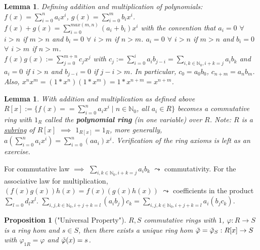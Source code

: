 \documentclass[11pt]{article}
\newtheorem{prop}[thm]{Proposition}
\newtheorem{lem}[thm]{Lemma}
\theoremstyle{definition}
\numberwithin{equation}{section}
\newcommand{\N}{\mathbb{N}} %
\begin{document}
\begin{lem}
Defining addition and multiplication  of polynomials: $f(x) = \sum_{i=0}^{n}a_{i}x^{i}$, $g(x) = \sum_{i=0}^{m}b_{i}x^{i}$.\\
$f(x) + g(x) = \sum_{i=0}^{max(m, n)} (a_{i}+b_{i})x^{i}$ with the convention that $a_{i} = 0$ $\forall$ $i > n$ if $m > n$ and $b_{i} = 0$ $\forall$ $i > m$ if $n > m$. $a_{i} = 0$ $\forall$ $i > n$ if $m > n$ and $b_{i} = 0$ $\forall$ $i > m$ if $n > m$. \\
$f(x)g(x) := \sum_{j=0}^{m+n} c_{j}x^{j}$ with $c_{j} := \sum_{i=0}^{i} a_{i}b_{j-i} = \sum_{i, k \in \N_{0}, i+k = j} a_{i}b_{k}$ and $a_{i} = 0$ if $i > n$ and $b_{j-i} = 0$ if $j - i > m$. In particular, $c_{0} = a_{0}b_{0}$, $c_{n+m} = a_{n}b_{m}$. Also, $x^{n}x^{m} = (1*x^{n})(1*x^{m}) = 1*x^{n+m} = x^{n+m}$.
\end{lem}

\begin{lem}
With addition and multiplication as defined above $R[x] := \{f(x) = = \sum_{i=0}^{n} a_{i}x^{i} \mid n \in \N_{0}$, all $a_{i} \in R \}$ becomes a commutative ring with $1_{R}$ called the \textbf{polynomial ring} (in one variable) over $R$. Note: $R$ is a \underline{subring} of $R[x]$ $\implies$ $1_{R[x]} = 1_{R}$, more generally, $a(\sum_{i=0}^{n} a_{i}x^{i}) = \sum_{i = 0}^{n}(aa_{i})x^{i}$. Verification of the ring axioms is left as an exercise.
\end{lem}

For commutative law $\implies$ $\sum_{i, k \in \N_{0}, i + k = j} a_{i}b_{k}$ $\leadsto$ commutativity. For the associative law for multiplication, $(f(x)g(x))h(x) = f(x)(g(x)h(x))$ $\leadsto$ coefficients in the product $\sum_{l = 0} d_{l}x^{l}$. $\sum_{i, j, k \in \N_{0}, i + j + k = l} (a_{i}b_{j})c_{k} = \sum_{i, j, k \in \N_{0}, i + j + k = l}a_{i}(b_{j}c_{k})$.

\begin{prop}["Universal Property"]
$R, S$ commutative rings with $1$, $\varphi: R \rightarrow S$ is a ring hom and $s \in S$, then there exists a unique ring hom $\Tilde{\varphi} = \Tilde{\varphi}_{S}: R[x] \rightarrow S$ with $\varphi_{1R} = \varphi$ and $\Tilde{\varphi}(x) = s$.
\end{prop}
\end{document}
